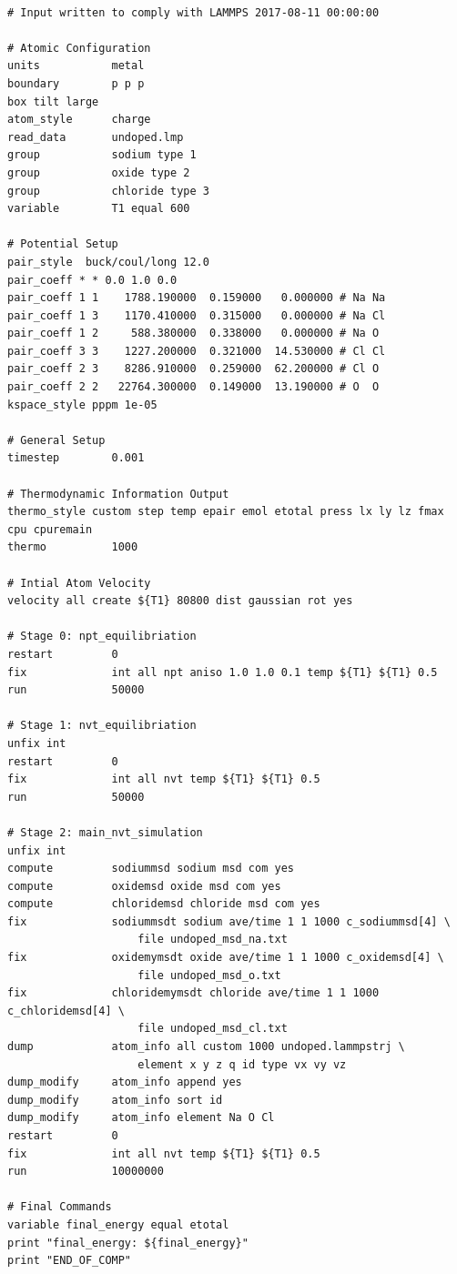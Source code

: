 \documentclass[12pt]{report}
\begin{document}
\begin{Verbatim}[fontsize=\footnotesize]

# Input written to comply with LAMMPS 2017-08-11 00:00:00

# Atomic Configuration
units           metal
boundary        p p p
box tilt large
atom_style      charge
read_data       undoped.lmp
group           sodium type 1
group           oxide type 2
group           chloride type 3
variable        T1 equal 600

# Potential Setup
pair_style  buck/coul/long 12.0
pair_coeff * * 0.0 1.0 0.0
pair_coeff 1 1    1788.190000  0.159000   0.000000 # Na Na
pair_coeff 1 3    1170.410000  0.315000   0.000000 # Na Cl
pair_coeff 1 2     588.380000  0.338000   0.000000 # Na O 
pair_coeff 3 3    1227.200000  0.321000  14.530000 # Cl Cl
pair_coeff 2 3    8286.910000  0.259000  62.200000 # Cl O 
pair_coeff 2 2   22764.300000  0.149000  13.190000 # O  O 
kspace_style pppm 1e-05

# General Setup
timestep        0.001

# Thermodynamic Information Output
thermo_style custom step temp epair emol etotal press lx ly lz fmax cpu cpuremain
thermo          1000

# Intial Atom Velocity
velocity all create ${T1} 80800 dist gaussian rot yes

# Stage 0: npt_equilibriation
restart         0
fix             int all npt aniso 1.0 1.0 0.1 temp ${T1} ${T1} 0.5 
run             50000

# Stage 1: nvt_equilibriation
unfix int
restart         0
fix             int all nvt temp ${T1} ${T1} 0.5 
run             50000

# Stage 2: main_nvt_simulation
unfix int
compute         sodiummsd sodium msd com yes
compute         oxidemsd oxide msd com yes
compute         chloridemsd chloride msd com yes
fix             sodiummsdt sodium ave/time 1 1 1000 c_sodiummsd[4] \ 
                    file undoped_msd_na.txt
fix             oxidemymsdt oxide ave/time 1 1 1000 c_oxidemsd[4] \ 
                    file undoped_msd_o.txt
fix             chloridemymsdt chloride ave/time 1 1 1000 c_chloridemsd[4] \ 
                    file undoped_msd_cl.txt
dump            atom_info all custom 1000 undoped.lammpstrj \ 
                    element x y z q id type vx vy vz
dump_modify     atom_info append yes
dump_modify     atom_info sort id
dump_modify     atom_info element Na O Cl
restart         0
fix             int all nvt temp ${T1} ${T1} 0.5 
run             10000000

# Final Commands
variable final_energy equal etotal
print "final_energy: ${final_energy}"
print "END_OF_COMP"

\end{Verbatim}
\end{document}
